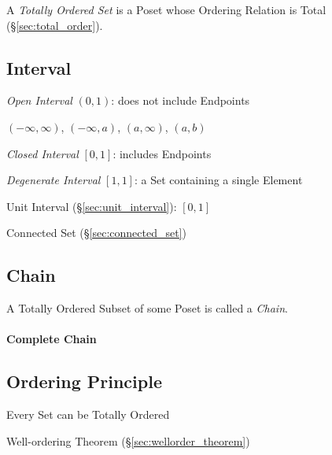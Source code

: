 A \emph{Totally Ordered Set} is a Poset whose Ordering Relation is
Total (\S\ref{sec:total_order}).


\subsection{Interval}\label{sec:interval}

\emph{Open Interval} $(0,1)$: does not include Endpoints

$(-\infty, \infty)$, $(-\infty,a)$, $(a,\infty)$, $(a,b)$

\emph{Closed Interval} $[0,1]$: includes Endpoints

\emph{Degenerate Interval} $[1,1]$: a Set containing a single Element

Unit Interval (\S\ref{sec:unit_interval}): $[0,1]$

Connected Set (\S\ref{sec:connected_set})



\subsection{Chain}\label{sec:chain}

A Totally Ordered Subset of some Poset is called a \emph{Chain}.

\paragraph{Complete Chain}\label{sec:complete_chain}\hfill



\subsection{Ordering Principle}\label{sec:ordering_principle}

Every Set can be Totally Ordered

Well-ordering Theorem (\S\ref{sec:wellorder_theorem})



